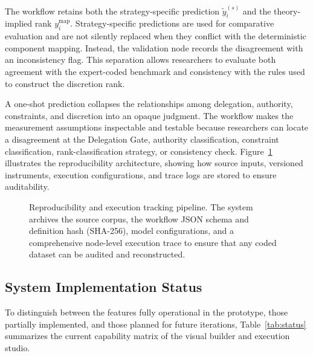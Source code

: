 \documentclass[conference]{IEEEtran}
\begin{document}
The workflow retains both the strategy-specific prediction \(\tilde y_i^{(s)}\) and the theory-implied rank \(y_i^{\mathrm{map}}\). Strategy-specific predictions are used for comparative evaluation and are not silently replaced when they conflict with the deterministic component mapping. Instead, the validation node records the disagreement with an inconsistency flag. This separation allows researchers to evaluate both agreement with the expert-coded benchmark and consistency with the rules used to construct the discretion rank.

A one-shot prediction collapses the relationships among delegation, authority, constraints, and discretion into an opaque judgment. The workflow makes the measurement assumptions inspectable and testable because researchers can locate a disagreement at the Delegation Gate, authority classification, constraint classification, rank-classification strategy, or consistency check. Figure~\ref{fig:reproducibility} illustrates the reproducibility architecture, showing how source inputs, versioned instruments, execution configurations, and trace logs are stored to ensure auditability.

\begin{figure}[t]
\centering
\resizebox{0.9\textwidth}{!}{}
\caption{Reproducibility and execution tracking pipeline. The system archives the source corpus, the workflow JSON schema and definition hash (SHA-256), model configurations, and a comprehensive node-level execution trace to ensure that any coded dataset can be audited and reconstructed.}
\label{fig:reproducibility}
\end{figure}


\subsection{System Implementation Status}

To distinguish between the features fully operational in the prototype, those partially implemented, and those planned for future iterations, Table~\ref{tab:status} summarizes the current capability matrix of the visual builder and execution studio.
\end{document}
